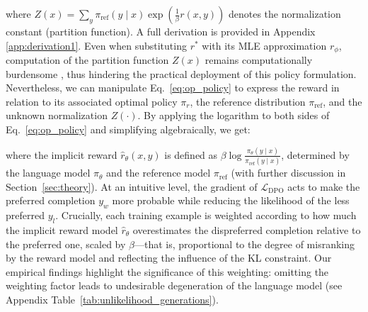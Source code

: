 where $Z(x) =\sum_{y}\pi_\text{ref}(y\mid x)\exp\left(\frac{1}{\beta}r(x, y)\right)$ denotes the normalization constant (partition function). A full derivation is provided in Appendix \ref{app:derivation1}. Even when substituting $r^*$ with its MLE approximation $r_\phi$, computation of the partition function $Z(x)$ remains computationally burdensome \citep{korbak2022reinforcement, go2023aligning}, thus hindering the practical deployment of this policy formulation. Nevertheless, we can manipulate Eq.~\ref{eq:op_policy} to express the reward in relation to its associated optimal policy $\pi_r$, the reference distribution $\pi_\text{ref}$, and the unknown normalization $Z(\cdot)$. By applying the logarithm to both sides of Eq.~\ref{eq:op_policy} and simplifying algebraically, we get:

where the implicit reward $\hat{r}_\theta(x, y)$ is defined as $\beta \log \frac{\pi_\theta(y \mid x)}{\pi_\text{ref}(y \mid x)}$, determined by the language model $\pi_\theta$ and the reference model $\pi_\text{ref}$ (with further discussion in Section~\ref{sec:theory}). At an intuitive level, the gradient of $\mathcal{L}_\text{DPO}$ acts to make the preferred completion $y_w$ more probable while reducing the likelihood of the less preferred $y_l$. Crucially, each training example is weighted according to how much the implicit reward model $\hat{r}_\theta$ overestimates the dispreferred completion relative to the preferred one, scaled by $\beta$—that is, proportional to the degree of misranking by the reward model and reflecting the influence of the KL constraint. Our empirical findings highlight the significance of this weighting: omitting the weighting factor leads to undesirable degeneration of the language model (see Appendix Table~\ref{tab:unlikelihood_generations}).

